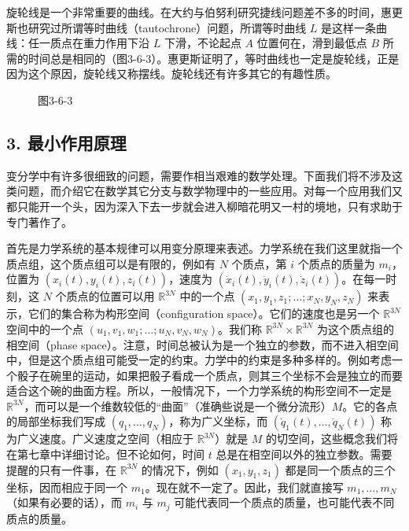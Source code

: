 旋轮线是一个非常重要的曲线。在大约与伯努利研究捷线问题差不多的时间，惠更斯也研究过所谓等时曲线（tautochrone）问题，所谓等时曲线 $L$ 是这样一条曲线：任一质点在重力作用下沿 $L$ 下滑，不论起点 $A$ 位置何在，滑到最低点 $B$ 所需的时间总是相同的（图3-6-3）。惠更斯证明了，等时曲线也一定是旋轮线，正是因为这个原因，旋轮线又称摆线。旋轮线还有许多其它的有趣性质。

\begin{figure}[htbp]
\centering
{}
\caption*{图3-6-3}
\end{figure}

\subsection*{3. 最小作用原理}

变分学中有许多很细致的问题，需要作相当艰难的数学处理。下面我们将不涉及这类问题，而介绍它在数学其它分支与数学物理中的一些应用。对每一个应用我们又都只能开一个头，因为深入下去一步就会进入柳暗花明又一村的境地，只有求助于专门著作了。

首先是力学系统的基本规律可以用变分原理来表述。力学系统在我们这里就指一个质点组，这个质点组可以是有限的，例如有 $N$ 个质点，第 $i$ 个质点的质量为 $m_i$，位置为 $(x_i(t),y_i(t),z_i(t))$，速度为 $(\dot x_i(t),\dot y_i(t),\dot z_i(t))$。在每一时刻，这 $N$ 个质点的位置可以用 $\mathbb R^{3N}$ 中的一个点 $(x_1,y_1,z_1;\ldots;x_N,y_N,z_N)$ 来表示，它们的集合称为构形空间（configuration space）。它们的速度也是另一个 $\mathbb R^{3N}$ 空间中的一个点 $(u_1,v_1,w_1;\ldots;u_N,v_N,w_N)$。我们称 $\mathbb R^{3N}\times\mathbb R^{3N}$ 为这个质点组的相空间（phase space）。注意，时间总被认为是一个独立的参数，而不进入相空间中，但是这个质点组可能受一定的约束。力学中的约束是多种多样的。例如考虑一个骰子在碗里的运动，如果把骰子看成一个质点，则其三个坐标不会是独立的而要适合这个碗的曲面方程。所以，一般情况下，一个力学系统的构形空间不一定是 $\mathbb R^{3N}$，而可以是一个维数较低的“曲面”（准确些说是一个微分流形）$M$。它的各点的局部坐标我们写成 $(q_1,\ldots,q_N)$，称为广义坐标，而 $(\dot q_1(t),\ldots,\dot q_N(t))$ 称为广义速度。广义速度之空间（相应于 $\mathbb R^{3N}$）就是 $M$ 的切空间，这些概念我们将在第七章中详细讨论。但不论如何，时间 $t$ 总是在相空间以外的独立参数。需要提醒的只有一件事，在 $\mathbb R^{3N}$ 的情况下，例如 $(x_1,y_1,z_1)$ 都是同一个质点的三个坐标，因而相应于同一个 $m_1$。现在就不一定了。因此，我们就直接写 $m_1,\ldots,m_N$（如果有必要的话），而 $m_i$ 与 $m_j$ 可能代表同一个质点的质量，也可能代表不同质点的质量。


